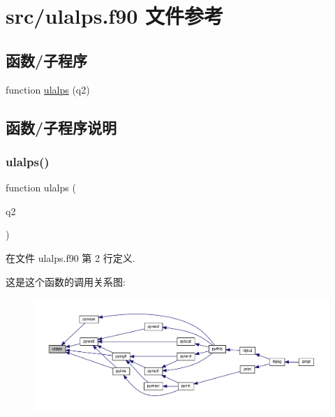 \hypertarget{ulalps_8f90}{}\section{src/ulalps.f90 文件参考}
\label{ulalps_8f90}
\subsection*{函数/子程序}
\begin{DoxyCompactItemize}
\item 
function \mbox{\hyperlink{ulalps_8f90_a1e3c027c8926c6e507f57ea2348a8d96}{ulalps}} (q2)
\end{DoxyCompactItemize}


\subsection{函数/子程序说明}
\mbox{\label{ulalps_8f90_a1e3c027c8926c6e507f57ea2348a8d96}} 
\subsubsection{\texorpdfstring{ulalps()}{ulalps()}}
{\footnotesize\ttfamily function ulalps (\begin{DoxyParamCaption}\item[{}]{q2 }\end{DoxyParamCaption})}



在文件 ulalps.\+f90 第 2 行定义.

这是这个函数的调用关系图\+:
\nopagebreak
\begin{figure}[H]
\begin{center}
\leavevmode
\includegraphics[width=350pt]{ulalps_8f90_a1e3c027c8926c6e507f57ea2348a8d96_icgraph}
\end{center}
\end{figure}
